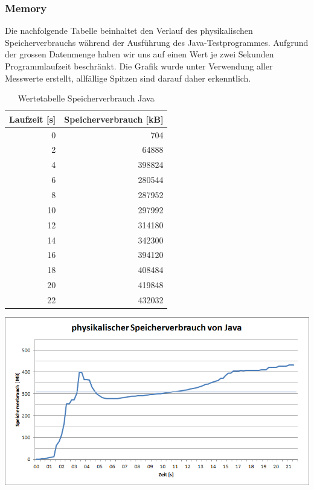 \documentclass{fancydocument}
\begin{document}
\subsubsection{Memory}
Die nachfolgende Tabelle beinhaltet den Verlauf des physikalischen Speicherverbrauchs während der Ausführung des Java-Testprogrammes. Aufgrund der grossen Datenmenge haben wir uns auf einen Wert je zwei Sekunden Programmlaufzeit beschränkt. Die Grafik wurde unter Verwendung aller Messwerte erstellt, allfällige Spitzen sind darauf daher erkenntlich.
\begin{table}[h!]
\centering
\begin{tabular}{|r|r|} \hline
\textbf{Laufzeit [s]} & \textbf{Speicherverbrauch [kB]}\\
\hline
0 & 704\\
\hline
2 & 64888\\
\hline
4 & 398824\\
\hline
6 & 280544\\
\hline
8 & 287952\\
\hline
10 & 297992\\
\hline
12 & 314180\\
\hline
14 & 342300\\
\hline
16 & 394120\\
\hline
18 & 408484\\
\hline
20 & 419848\\
\hline
22 & 432032
\\
\hline
\end{tabular}
\caption{Wertetabelle Speicherverbrauch Java}
\end{table}
\begin{center}
\includegraphics[width=\linewidth]{bilder/MemoryJava.png}
\end{center}
\end{document}

